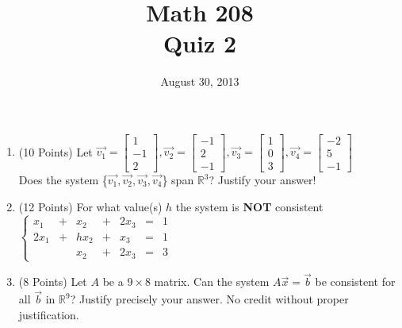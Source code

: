 \documentclass[12pt]{article}
\title{Math 208\\Quiz 2}
\date{August 30, 2013}
\begin{document}
\maketitle
\begin{enumerate}
\item (10 Points) Let $\vec{v_1}=\left[\begin{array}{r}1\\-1\\2\end{array}\right], \vec{v_2}=\left[\begin{array}{r}-1\\2\\-1\end{array}\right],\vec{v_3}=\left[\begin{array}{r}1\\0\\3\end{array}\right], \vec{v_4}=\left[\begin{array}{r}-2\\5\\-1\end{array}\right]$\\Does the system \{$\vec{v_1},\vec{v_2},\vec{v_3},\vec{v_4}$\} span $\mathbb{R}^3$? Justify your answer!
\item (12 Points) For what value(s) $h$ the system is \textbf{NOT} consistent $\left\{\begin{array}{ccccccc}
x_1&+& x_2&+&2x_3&=&1\\
2x_1&+&hx_2&+&x_3&=&1\\
&&x_2&+&2x_3&=&3
\end{array}\right.$
\item (8 Points) Let $A$ be a $9 \times 8$ matrix. Can the system $A\vec{x}=\vec{b}$ be consistent for all $\vec{b}$ in $\mathbb{R}^9$? Justify precisely your answer. No credit without proper justification.
\end{enumerate}
\end{document}
